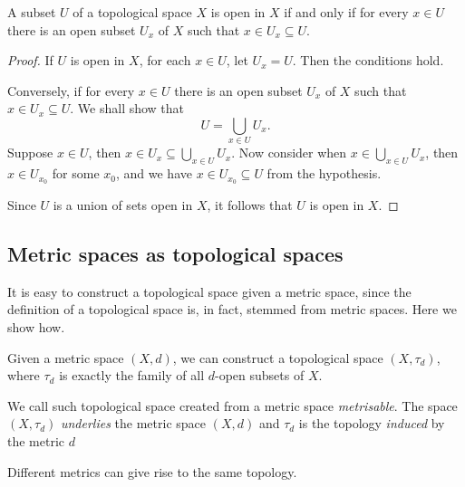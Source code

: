 \documentclass[main.tex]{subfiles}
\begin{document}
		\begin{theorem}
			A subset $U$ of a topological space $X$ is open in $X$ if and only if for every $x \in U$ there is an open subset $U_x$ of $X$ such that $x \in U_x \subseteq U$.
		\end{theorem}
		\begin{proof}
			If $U$ is open in $X$, for each $x \in U$, let $U_x = U$. Then the conditions hold.
			
			Conversely, if for every $x \in U$ there is an open subset $U_x$ of $X$ such that $x \in U_x \subseteq U$. We shall show that
			\begin{equation*}
				U = \bigcup_{x \in U} U_x.
			\end{equation*}
			Suppose $x \in U$, then $x \in U_x \subseteq \bigcup_{x \in U} U_x$. Now consider when $x \in \bigcup_{x \in U} U_x$, then $x \in U_{x_0}$ for some $x_0$, and we have $x \in U_{x_0} \subseteq U$ from the hypothesis.
			
			Since $U$ is a union of sets open in $X$, it follows that $U$ is open in $X$.
		\end{proof}
		\subsection{Metric spaces as topological spaces}
		It is easy to construct a topological space given a metric space, since the definition of a topological space is, in fact, stemmed from metric spaces. Here we show how.
		\begin{example}
			Given a metric space $(X, d)$, we can construct a topological space $(X, \tau_d)$, where $\tau_d$ is exactly the family of all $d$-open subsets of $X$.
			
			We call such topological space created from a metric space \textit{metrisable}. The space $(X, \tau_d)$ \textit{underlies} the metric space $(X, d)$ and $\tau_d$ is the topology \textit{induced} by the metric $d$
		\end{example}
		Different metrics can give rise to the same topology.
\end{document}
